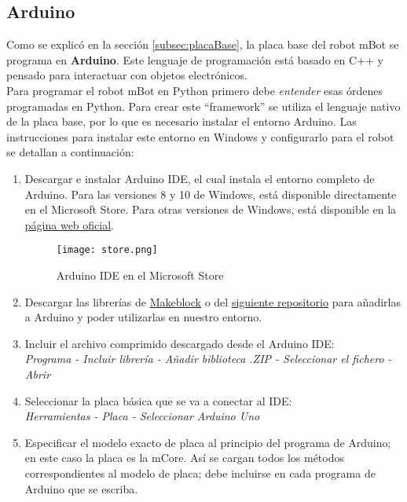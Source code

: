 \subsection{Arduino}\label{subsec:arduino}
Como se explicó en la sección \ref{subsec:placaBase}, la placa base del robot mBot se programa en \textbf{Arduino}. Este lenguaje de programación está basado en C++ y pensado para interactuar con objetos electrónicos. \\
Para programar el robot mBot en Python primero debe \textit{entender} esas órdenes programadas en Python. Para crear este ``framework'' se utiliza el lenguaje nativo de la placa base, por lo que es necesario instalar el entorno Arduino. Las instrucciones para instalar este entorno en Windows y configurarlo para el robot se detallan a continuación:
\begin{enumerate}\label{list:InstalacionArduino}
	\item Descargar e instalar Arduino IDE, el cual instala el entorno completo de Arduino. Para las versiones 8 y 10 de Windows, está disponible directamente en el Microsoft Store. Para otras versiones de Windows, está disponible en la \href{https://www.arduino.cc/en/software}{página web oficial}.
	\begin{figure}[h]
		\texttt{[image: store.png]}
		\centering
		\caption{Arduino IDE en el Microsoft Store}
		\label{img:MStore}
	\end{figure}
	\item Descargar las librerías de \href{https://codeload.github.com/Makeblock-official/Makeblock-Libraries/zip/master}{Makeblock} o del \href{https://github.com/JdeRobot/PyBoKids/tree/main/PyBoKids%202.0}{siguiente repositorio} para añadirlas a Arduino y poder utilizarlas en nuestro entorno.
	\item Incluir el archivo comprimido descargado desde el Arduino IDE:\\ \textit{Programa - Incluir librería - Añadir biblioteca .ZIP - Seleccionar el fichero - Abrir}
	\item Seleccionar la placa básica que se va a conectar al IDE:\\
	\textit{Herramientas - Placa - Seleccionar Arduino Uno}
	\item Especificar el modelo exacto de placa al principio del programa de Arduino; en este caso la placa es la mCore. Así se cargan todos los métodos correspondientes al modelo de placa; debe incluirse en cada programa de Arduino que se escriba.
	\begin{verbatim}	

\end{verbatim}
\end{enumerate}
